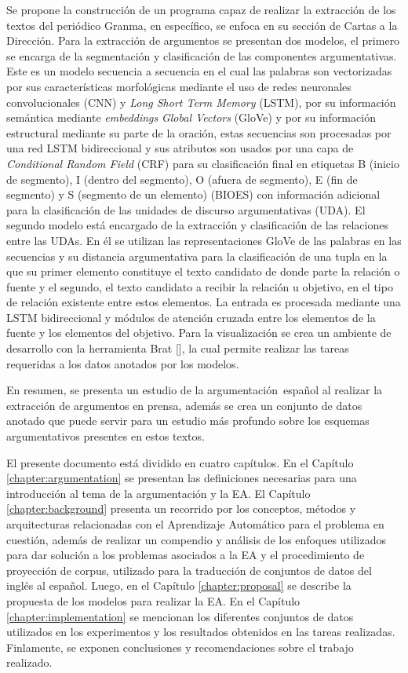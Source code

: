 Se propone la construcción de un programa capaz de realizar la extracción de los textos del periódico Granma, 
en específico, se enfoca en su sección de Cartas a la Dirección. Para la extracción
de argumentos se presentan dos modelos, el primero se encarga de la segmentación y clasificación
de las componentes argumentativas. Este es un modelo secuencia a secuencia en el cual las palabras 
son vectorizadas por sus características morfológicas mediante el uso de redes neuronales convolucionales
(CNN) y \emph{Long Short Term Memory} (LSTM), por su información
semántica mediante \emph{embeddings} \emph{Global Vectors} (GloVe) y por su información 
estructural mediante su parte de la oración, estas 
secuencias son procesadas por una red LSTM bidireccional y sus atributos son usados por una capa 
de \emph{Conditional Random Field} (CRF) 
para su clasificación final en etiquetas B (inicio de segmento), I (dentro del segmento), O (afuera de segmento), 
E (fin de segmento) y S (segmento de un elemento) (BIOES) con información adicional para la clasificación de las 
unidades de discurso argumentativas (UDA). El segundo modelo está encargado de la extracción y clasificación 
de las relaciones entre las UDAs. En él se utilizan las representaciones GloVe de las palabras en las secuencias 
y su distancia argumentativa para la clasificación de una tupla en la que su primer elemento 
constituye el texto candidato de donde parte la relación o fuente y el segundo, el texto candidato a recibir la 
relación u objetivo, en el tipo de relación existente entre estos elementos. La entrada es procesada mediante 
una LSTM bidireccional y módulos de atención cruzada entre los elementos de la fuente y los elementos del objetivo.
Para la visualización se crea un ambiente de desarrollo con la herramienta Brat [\cite{brat}], la cual permite realizar las 
tareas requeridas a los datos anotados por los modelos.

En resumen, se presenta un estudio de la argumentación\ español al realizar la extracción de 
argumentos en prensa, además se crea un conjunto de datos anotado que puede servir
para un estudio más profundo sobre los esquemas argumentativos presentes en estos textos. 


El presente documento está dividido en cuatro capítulos.
En el Capítulo \ref{chapter:argumentation} se presentan las definiciones necesarias para una introducción
al tema de la argumentación y la EA.
El Capítulo \ref{chapter:background} presenta un recorrido por los 
conceptos, métodos y arquitecturas relacionadas con el Aprendizaje Automático para el problema 
en cuestión, además de realizar un compendio y análisis de los enfoques utilizados para dar solución
a los problemas asociados a la EA y el procedimiento de proyección de corpus, utilizado para la 
traducción de conjuntos de datos del inglés al español. 
Luego, en el Capítulo \ref{chapter:proposal}
se describe la propuesta de los modelos para realizar la EA.
En el Capítulo \ref{chapter:implementation} se mencionan los diferentes conjuntos de datos utilizados 
en los experimentos y los resultados obtenidos en las tareas realizadas.
Finlamente, se exponen conclusiones y recomendaciones sobre el trabajo 
realizado.
